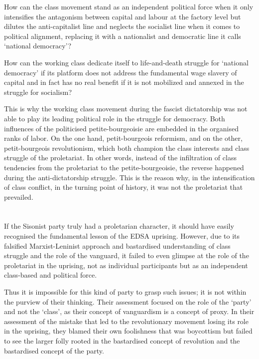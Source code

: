 How can the class movement stand 
as an independent political force 
when it only intensifies the antagonism 
between capital and labour at the factory level 
but dilutes the anti-capitalist line 
and neglects the socialist line 
when it comes to political alignment, 
replacing it with a nationalist and democratic line 
it calls `national democracy'?

How can the working class dedicate itself 
to life-and-death struggle for `national democracy' 
if its platform does not address 
the fundamental wage slavery of capital 
and in fact has no real benefit 
if it is not mobilized and annexed 
in the struggle for socialism?

This is why the working class movement during the fascist dictatorship 
was not able to play its leading political role in the struggle for democracy. 
Both influences of the politicised petite-bourgeoisie 
are embedded in the organised ranks of labor. 
On the one hand, petit-bourgeois reformism, 
and on the other, petit-bourgeois revolutionism, 
which both champion the class interests and class struggle of the proletariat. 
In other words, instead of the infiltration of class tendencies 
from the proletariat to the petite-bourgeoisie, 
the reverse happened during the anti-dictatorship struggle.
This is the reason why, 
in the intensification of class conflict, 
in the turning point of history, 
it was not the proletariat that prevailed.

\section{}
If the Sisonist party truly had a proletarian character, 
it should have easily recognised the fundamental lesson of the EDSA uprising. 
However, due to its falsified Marxist-Leninist approach 
and bastardised understanding of class struggle and the role of the vanguard, 
it failed to even glimpse 
at the role of the proletariat in the uprising, 
not as individual participants 
but as an independent class-based and political force.

Thus 
it is impossible for this kind of party 
to grasp such issues;
it is not within the purview of their thinking. 
Their assessment focused 
on the role of the `party' and not the `class', 
as their concept of vanguardism is a concept of proxy. 
In their assessment of the mistake that led 
to the revolutionary movement losing its role in the uprising, 
they blamed their own foolishness that was boycottism 
but failed to see the larger folly 
rooted in the bastardised concept of revolution 
and the bastardised concept of the party.


